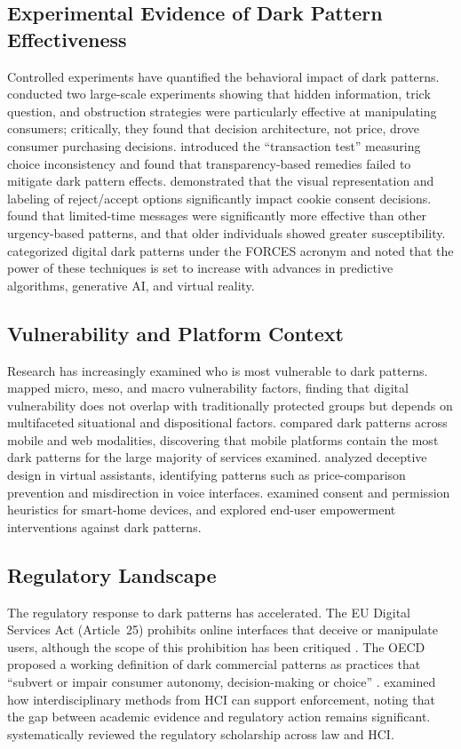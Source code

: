 \documentclass[a4paper,fleqn]{cas-sc}
\begin{document}
\subsection{Experimental Evidence of Dark Pattern Effectiveness}
Controlled experiments have quantified the behavioral impact of dark patterns. \citet{luguri2021} conducted two large-scale experiments showing that hidden information, trick question, and obstruction strategies were particularly effective at manipulating consumers; critically, they found that decision architecture, not price, drove consumer purchasing decisions. \citet{bogliacino2026} introduced the ``transaction test'' measuring choice inconsistency and found that transparency-based remedies failed to mitigate dark pattern effects. \citet{berens2024} demonstrated that the visual representation and labeling of reject/accept options significantly impact cookie consent decisions. \citet{koh2023} found that limited-time messages were significantly more effective than other urgency-based patterns, and that older individuals showed greater susceptibility. \citet{fagan2024} categorized digital dark patterns under the FORCES acronym and noted that the power of these techniques is set to increase with advances in predictive algorithms, generative AI, and virtual reality.

\subsection{Vulnerability and Platform Context}
Research has increasingly examined who is most vulnerable to dark patterns. \citet{rossi2024} mapped micro, meso, and macro vulnerability factors, finding that digital vulnerability does not overlap with traditionally protected groups but depends on multifaceted situational and dispositional factors. \citet{gunawan2021} compared dark patterns across mobile and web modalities, discovering that mobile platforms contain the most dark patterns for the large majority of services examined. \citet{deconca2023} analyzed deceptive design in virtual assistants, identifying patterns such as price-comparison prevention and misdirection in voice interfaces. \citet{chalhoub2024} examined consent and permission heuristics for smart-home devices, and \citet{lu2024} explored end-user empowerment interventions against dark patterns.

\subsection{Regulatory Landscape}
The regulatory response to dark patterns has accelerated. The EU Digital Services Act (Article~25) prohibits online interfaces that deceive or manipulate users, although the scope of this prohibition has been critiqued \citep{isola2025}. The OECD proposed a working definition of dark commercial patterns as practices that ``subvert or impair consumer autonomy, decision-making or choice'' \citep{oecd2022}. \citet{gunawan2025} examined how interdisciplinary methods from HCI can support enforcement, noting that the gap between academic evidence and regulatory action remains significant. \citet{yi2025} systematically reviewed the regulatory scholarship across law and HCI.
\end{document}
